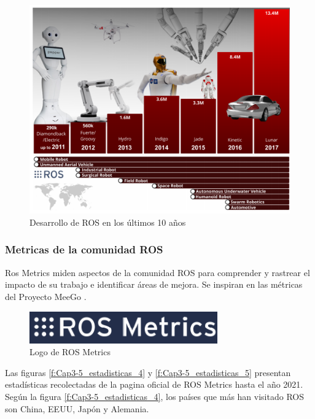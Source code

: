             \begin{figure}[htb]
                \centering
                \includegraphics[width=1.0\linewidth]{Main/Chapter3/Images3/science_robot_esta_2.png}
                \caption{Desarrollo de ROS en los últimos 10 años \cite{Zhangeaar1868}}
                \label{f:Cap3-5_estadisticas_2}
            \end{figure}  


         \newpage
    
        \subsubsection{Metricas de la comunidad ROS}
    
    Ros Metrics miden aspectos de la comunidad ROS para comprender y rastrear el impacto de su trabajo e identificar áreas de mejora. Se inspiran en las métricas del Proyecto MeeGo .
    
        \begin{figure}[htb]
            \centering
            \includegraphics[width=0.4\linewidth]{Main/Chapter3/Images3/cap3_estadisticas_3.png}
            \caption{Logo de ROS Metrics \cite{rosmetrics}}
            \label{f:Cap3-5_estadisticas_3}
        \end{figure}  
        
        Las figuras \ref{f:Cap3-5_estadisticas_4} y \ref{f:Cap3-5_estadisticas_5} presentan estadísticas recolectadas de la pagina oficial de ROS Metrics hasta el año 2021. Según la figura \ref{f:Cap3-5_estadisticas_4}, los países que más han visitado ROS son China, EEUU, Japón y Alemania. 
        
